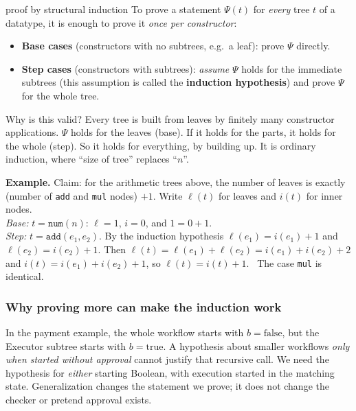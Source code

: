\begin{toolbox}{proof by structural induction}
To prove a statement $\Psi(t)$ for \emph{every} tree $t$ of a datatype, it is enough to prove it \emph{once per constructor}:
\begin{itemize}
\item \textbf{Base cases} (constructors with no subtrees, e.g.\ a leaf): prove $\Psi$ directly.
\item \textbf{Step cases} (constructors with subtrees): \emph{assume} $\Psi$ holds for the immediate subtrees (this assumption is called the \textbf{induction hypothesis}) and prove $\Psi$ for the whole tree.
\end{itemize}
Why is this valid? Every tree is built from leaves by finitely many constructor applications. $\Psi$ holds for the leaves (base). If it holds for the parts, it holds for the whole (step). So it holds for everything, by building up. It is ordinary induction, where ``size of tree'' replaces ``$n$''.

\medskip
\textbf{Example.} Claim: for the arithmetic trees above, the number of leaves is exactly (number of \texttt{add} and \texttt{mul} nodes) $+1$. Write $\ell(t)$ for leaves and $i(t)$ for inner nodes.\\
\emph{Base:} $t=\texttt{num}(n)$: $\ell=1$, $i=0$, and $1=0+1$. \checkmark\\
\emph{Step:} $t=\texttt{add}(e_1,e_2)$. By the induction hypothesis $\ell(e_1)=i(e_1)+1$ and $\ell(e_2)=i(e_2)+1$. Then $\ell(t)=\ell(e_1)+\ell(e_2)=i(e_1)+i(e_2)+2$ and $i(t)=i(e_1)+i(e_2)+1$, so $\ell(t)=i(t)+1$. \checkmark\ The case \texttt{mul} is identical.
\end{toolbox}

\subsubsection{Why proving more can make the induction work}
\label{sec:generalization}

In the payment example, the whole workflow starts with $b=\mathrm{false}$, but the Executor subtree starts with $b=\mathrm{true}$. A hypothesis about smaller workflows \emph{only when started without approval} cannot justify that recursive call. We need the hypothesis for \emph{either} starting Boolean, with execution started in the matching state. Generalization changes the statement we prove; it does not change the checker or pretend approval exists.

